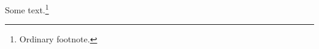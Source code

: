 \documentclass[12pt]{article}
\begin{document}

\linenumbers 

Some text.\footnote{Ordinary footnote.} 
\end{document}
